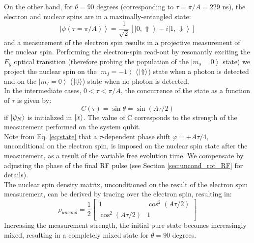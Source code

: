 On the other hand, for $\theta = 90$ degrees (corresponding to $\tau = \pi/A = 229$ ns), the electron and nuclear spins are in a maximally-entangled state:
\begin{equation}
\left| \psi (\tau=\pi/A) \right \rangle = \frac{1}{\sqrt{2}} \left[ \left| 0, \Uparrow \right \rangle -i \left| 1, \Downarrow \right \rangle \right]
\end{equation}
and a measurement of the electron spin results in a projective measurement of the nuclear spin. Performing the electron-spin read-out by resonantly exciting the $E_y$ optical transition (therefore probing the population of the $\left| m_s=0 \right \rangle$ state) we project the nuclear spin on the $\left| m_I = -1 \right \rangle$ ($\left|\Uparrow\right>$) state when a photon is detected and on the $\left| m_I = 0 \right \rangle$ ($\left|\Downarrow\right>$) state when no photon is detected.\\
In the intermediate cases, $0<\tau<\pi/A$, the concurrence of the state as a function of $\tau$ is given by:
\begin{equation}
 C (\tau) = \sin\theta=\sin \left( A \tau/2 \right) 
\label{eq:concurrence}
\end{equation}
if $\left|\psi_N\right>$ is initialized in $\left|x\right>$. The value of C corresponds to the strength of the measurement performed on the system qubit.\\
Note from Eq. \ref{eq:state} that a $\tau$-dependent phase shift $\varphi = + A \tau/4$, unconditional on the electron spin, is imposed on the nuclear spin state after the measurement, as a result of the variable free evolution time. We compensate by adjusting the phase of the final RF pulse (see Section \ref{sec:uncond_rot_RF} for details).\\
The nuclear spin density matrix, unconditioned on the result of the electron spin measurement, can be derived by tracing over the electron spin, resulting in:
\begin{equation}
 \rho_{uncond} = \frac{1}{2}
 \left[
\begin{array}{cc}
1 & \cos^2 ( A \tau/2)\\
\cos^2 ( A \tau/2) & 1
 \end{array}
 \right]
\label{eq:uncondRho}
 \end{equation}
Increasing the measurement strength, the initial pure state becomes increasingly mixed, resulting in a completely mixed state for $\theta = 90$ degrees.\\

